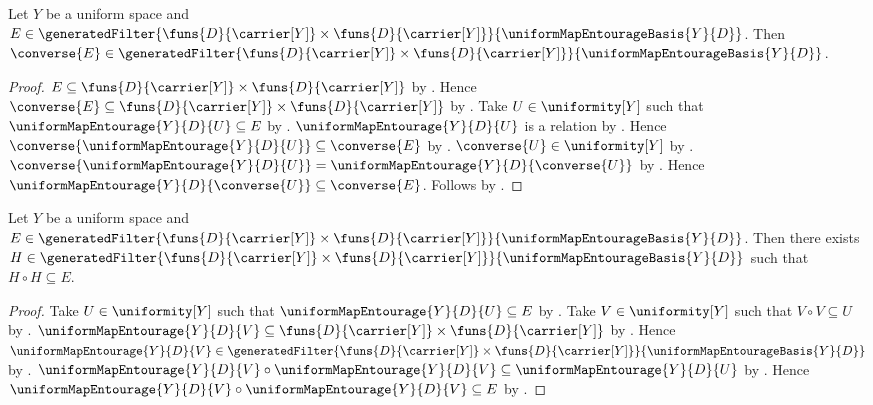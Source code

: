 \begin{proposition}\label{uniform_map_generated_uniformity_converse}
    Let $Y$ be a uniform space and
        $E\in\generatedFilter
            {\funs{D}{\carrier[Y]}\times\funs{D}{\carrier[Y]}}
            {\uniformMapEntourageBasis{Y}{D}}$.
    Then $\converse{E}\in\generatedFilter
        {\funs{D}{\carrier[Y]}\times\funs{D}{\carrier[Y]}}
        {\uniformMapEntourageBasis{Y}{D}}$.
\end{proposition}
\begin{proof}
    $E\subseteq\funs{D}{\carrier[Y]}\times\funs{D}{\carrier[Y]}$ by
        .
    Hence $\converse{E}\subseteq
        \funs{D}{\carrier[Y]}\times\funs{D}{\carrier[Y]}$ by
        .
    Take $U\in\uniformity[Y]$ such that
        $\uniformMapEntourage{Y}{D}{U}\subseteq E$ by
        .
    $\uniformMapEntourage{Y}{D}{U}$ is a relation by
        .
    Hence $\converse{\uniformMapEntourage{Y}{D}{U}}
        \subseteq\converse{E}$ by .
    $\converse{U}\in\uniformity[Y]$ by .
    $\converse{\uniformMapEntourage{Y}{D}{U}}=
        \uniformMapEntourage{Y}{D}{\converse{U}}$ by
        .
    Hence $\uniformMapEntourage{Y}{D}{\converse{U}}
        \subseteq\converse{E}$.
    Follows by .
\end{proof}

\begin{proposition}\label{uniform_map_generated_uniformity_square}
    Let $Y$ be a uniform space and
        $E\in\generatedFilter
            {\funs{D}{\carrier[Y]}\times\funs{D}{\carrier[Y]}}
            {\uniformMapEntourageBasis{Y}{D}}$.
    Then there exists $H\in\generatedFilter
        {\funs{D}{\carrier[Y]}\times\funs{D}{\carrier[Y]}}
        {\uniformMapEntourageBasis{Y}{D}}$ such that
        $H\circ H\subseteq E$.
\end{proposition}
\begin{proof}
    Take $U\in\uniformity[Y]$ such that
        $\uniformMapEntourage{Y}{D}{U}\subseteq E$ by
        .
    Take $V\in\uniformity[Y]$ such that $V\circ V\subseteq U$ by
        .
    $\uniformMapEntourage{Y}{D}{V}\subseteq
        \funs{D}{\carrier[Y]}\times\funs{D}{\carrier[Y]}$ by
        .
    Hence $\uniformMapEntourage{Y}{D}{V}\in\generatedFilter
        {\funs{D}{\carrier[Y]}\times\funs{D}{\carrier[Y]}}
        {\uniformMapEntourageBasis{Y}{D}}$ by
        .
    $\uniformMapEntourage{Y}{D}{V}\circ
            \uniformMapEntourage{Y}{D}{V}
        \subseteq\uniformMapEntourage{Y}{D}{U}$ by
        .
    Hence $\uniformMapEntourage{Y}{D}{V}\circ
        \uniformMapEntourage{Y}{D}{V}\subseteq E$ by
        .
\end{proof}

